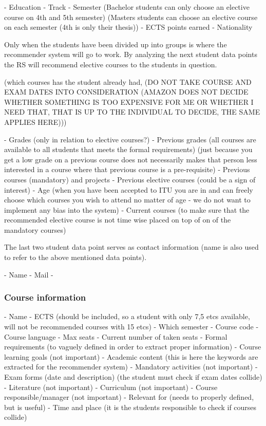 - Education
- Track
- Semester (Bachelor students can only choose an elective course on 4th and 5th semester) (Masters students can choose an elective course on each semester (4th is only their thesis))
- ECTS points earned
- Nationality

Only when the students have been divided up into groups is where the recommender system will go to work. By analyzing the next student data points the RS will recommend elective courses to the students in question.

(which courses has the student already had, (DO NOT TAKE COURSE AND EXAM DATES INTO CONSIDERATION (AMAZON DOES NOT DECIDE WHETHER SOMETHING IS TOO EXPENSIVE FOR ME OR WHETHER I NEED THAT, THAT IS UP TO THE INDIVIDUAL TO DECIDE, THE SAME APPLIES HERE)))

- Grades (only in relation to elective courses?)
- Previous grades (all courses are available to all students that meets the formal requirements) (just because you get a low grade on a previous course does not necessarily makes that person less interested in a course where that previous course is a pre-requisite)
- Previous courses (mandatory) and projects
- Previous elective courses (could be a sign of interest)
- Age (when you have been accepted to ITU you are in and can freely choose which courses you wish to attend no matter of age - we do not want to implement any bias into the system)
- Current courses (to make sure that the recommended elective course is not time wise placed on top of on of the mandatory courses)

The last two student data point serves as contact information (name is also used to refer to the above mentioned data points).
 
- Name
- Mail
- 

\subsubsection{Course information}

- Name
- ECTS (should be included, so a student with only 7,5 etcs available, will not be recommended courses with 15 etcs)
- Which semester
- Course code
- Course language
- Max seats
- Current number of taken seats
- Formal requirements (to vaguely defined in order to extract proper information)
- Course learning goals (not important)
- Academic content (this is here the keywords are extracted for the recommender system)
- Mandatory activities (not important)
- Exam forms (date and description) (the student must check if exam dates collide)
- Literature (not important)
- Curriculum (not important)
- Course responsible/manager (not important)
- Relevant for (needs to properly defined, but is useful)
- Time and place (it is the students responsible to check if courses collide)



